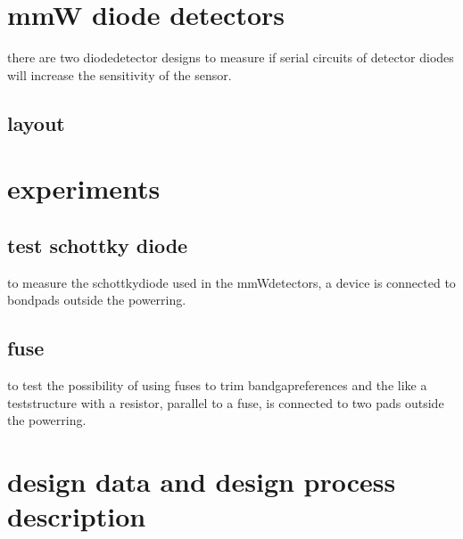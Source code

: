 \documentclass[letterpaper,10pt,english]{sphinxmanual}
\begin{document}
\sphinxstepscope


\chapter{mmW diode detectors}
\label{\detokenize{detectors:mmw-diode-detectors}}\label{\detokenize{detectors::doc}}
\sphinxAtStartPar
there are two diode\sphinxhyphen{}detector designs to measure if serial circuits of detector diodes will increase the sensitivity of the sensor.


\section{layout}
\label{\detokenize{detectors:layout}}

\sphinxAtStartPar


\sphinxstepscope


\chapter{experiments}
\label{\detokenize{tests:experiments}}\label{\detokenize{tests::doc}}

\section{test schottky diode}
\label{\detokenize{tests:test-schottky-diode}}
\sphinxAtStartPar
to measure the schottky\sphinxhyphen{}diode used in the mmW\sphinxhyphen{}detectors, a device is connected to bond\sphinxhyphen{}pads outside the power\sphinxhyphen{}ring.


\section{fuse}
\label{\detokenize{tests:fuse}}
\sphinxAtStartPar
to test the possibility of using fuses to trim band\sphinxhyphen{}gap\sphinxhyphen{}references and the like a test\sphinxhyphen{}structure with a resistor, parallel to a fuse, is connected to two pads outside the power\sphinxhyphen{}ring.

\sphinxstepscope


\chapter{design data and design process description}
\label{\detokenize{designdata:design-data-and-design-process-description}}\label{\detokenize{designdata::doc}}
\end{document}
